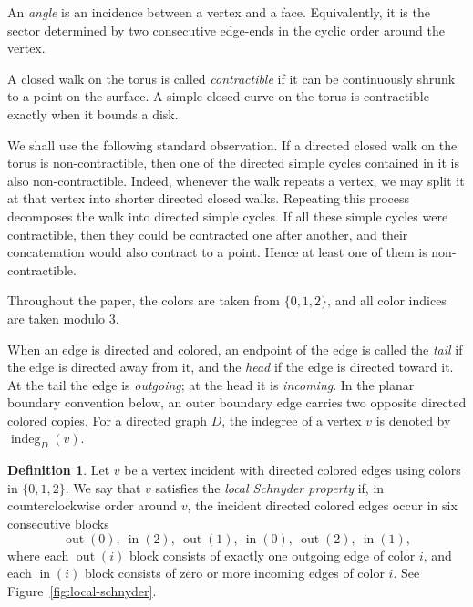 \documentclass[11pt]{amsart}
\newcommand{\Zthree}{\{0,1,2\}}
\newcommand{\indeg}{\operatorname{indeg}}
\newcommand{\out}{\operatorname{out}}
\newcommand{\inn}{\operatorname{in}}
\theoremstyle{plain}
\theoremstyle{definition}
\newtheorem{definition}[theorem]{Definition}
\theoremstyle{remark}
\begin{document}
An \emph{angle} is an incidence between a vertex and a face. Equivalently, it is the sector determined by two consecutive edge-ends in the cyclic order around the vertex.

A closed walk on the torus is called \emph{contractible} if it can be continuously shrunk to a point on the surface. A simple closed curve on the torus is contractible exactly when it bounds a disk.

We shall use the following standard observation. If a directed closed walk on the
torus is non-contractible, then one of the directed simple cycles contained in it is
also non-contractible. Indeed, whenever the walk repeats a vertex, we may split it at
that vertex into shorter directed closed walks. Repeating this process decomposes the
walk into directed simple cycles. If all these simple cycles were contractible, then
they could be contracted one after another, and their concatenation would also contract
to a point. Hence at least one of them is non-contractible.

Throughout the paper, the colors are taken from $\{0, 1, 2\}$, and all color indices are taken modulo $3$.

When an edge is directed and colored, an endpoint of the edge is called the \emph{tail} if the edge is directed away from it, and the \emph{head} if the edge is directed toward it. At the tail the edge is \emph{outgoing}; at the head it is \emph{incoming}. In the planar boundary convention below, an outer boundary edge carries two opposite directed colored copies. For a directed graph $D$, the indegree of a vertex $v$ is denoted by $\indeg_D(v)$.

\begin{definition}
\label{def:local-schnyder}
Let $v$ be a vertex incident with directed colored edges using colors in $\Zthree$. We say that $v$ satisfies the \emph{local Schnyder property} if, in counterclockwise order around $v$, the incident directed colored edges occur in six consecutive blocks
\[
  \out(0),\ \inn(2),\ \out(1),\ \inn(0),\ \out(2),\ \inn(1),
\]
where each $\out(i)$ block consists of exactly one outgoing edge of color $i$, and each $\inn(i)$ block consists of zero or more incoming edges of color $i$. See Figure~\ref{fig:local-schnyder}.
\end{definition}
\end{document}
